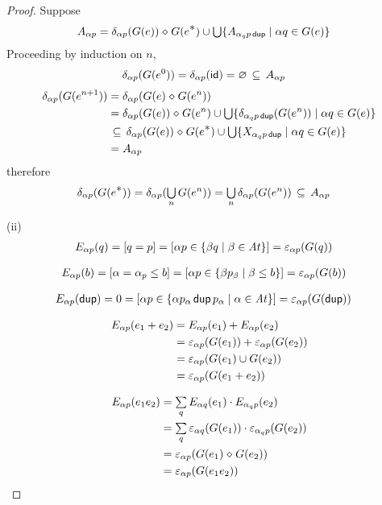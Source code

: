 \documentclass{article}
\newcommand\At{\ensuremath{\mathit{At}}}
\renewcommand\smash{\mathrel{\diamond}}
\newcommand\ssum{\mathop{\textstyle\sum}}
\newcommand\pdup{\mathop{\mathsf{dup}}}
\newcommand\bval[1]{[#1]}
\renewcommand\star{^{\textstyle *}}
\newcommand\id{\mathsf{id}}
\newcommand\sbigcup{\mathop{\textstyle\bigcup}}
\begin{document}
\begin{proof}
Suppose
\begin{align*}
A_{\alpha p}
&= \delta_{\alpha p}(G(e))\smash G(e\star) \cup \sbigcup \set{A_{\alpha_q p\pdup}}{\alpha q\in G(e)}
\end{align*}
Proceeding by induction on $n$,
\begin{align*}
\delta_{\alpha p}(G(e^0))
&= \delta_{\alpha p}(\id)
= \emptyset
\subs A_{\alpha p}
\end{align*}
\begin{align*}
\delta_{\alpha p}(G(e^{n+1}))
&= \delta_{\alpha p}(G(e)\smash G(e^n))\\
&= \delta_{\alpha p}(G(e))\smash G(e^n) \cup \sbigcup \set{\delta_{\alpha_q p\pdup}(G(e^n))}{\alpha q\in G(e)}\\
&\subs \delta_{\alpha p}(G(e))\smash G(e\star) \cup \sbigcup \set{X_{\alpha_q p\pdup}}{\alpha q\in G(e)}\\
&= A_{\alpha p}
\end{align*}
therefore
\begin{align*}
\delta_{\alpha p}(G(e\star))
&= \delta_{\alpha p}(\sbigcup_n G(e^n))
= \sbigcup_n\delta_{\alpha p}(G(e^n))
\subs A_{\alpha p}
\end{align*}

(ii)
\begin{align*}
E_{\alpha p}(q)
&= \bval{q = p}
= \bval{\alpha p\in\set{\beta q}{\beta\in\At}}
= \eps_{\alpha p}(G(q))
\end{align*}

\begin{align*}
E_{\alpha p}(b)
&= \bval{\alpha=\alpha_p\leq b}
= \bval{\alpha p\in\set{\beta p_\beta}{\beta\leq b}}
= \eps_{\alpha p}(G(b))
\end{align*}

\begin{align*}
E_{\alpha p}(\pdup)
&= 0
= \bval{\alpha p\in\set{\alpha p_\alpha\pdup p_\alpha}{\alpha\in\At}}
= \eps_{\alpha p}(G(\pdup))
\end{align*}

\begin{align*}
E_{\alpha p}(e_1+e_2)
&= E_{\alpha p}(e_1)+E_{\alpha p}(e_2)\\
&= \varepsilon_{\alpha p}(G(e_1)) + \varepsilon_{\alpha p}(G(e_2))\\
&= \varepsilon_{\alpha p}(G(e_1)\cup G(e_2))\\
&= \varepsilon_{\alpha p}(G(e_1+e_2))
\end{align*}

\begin{align*}
E_{\alpha p}(e_1e_2)
&= \ssum_{q} E_{\alpha q}(e_1)\cdot E_{\alpha_q p}(e_2)\\
&= \ssum_{q} \eps_{\alpha q}(G(e_1))\cdot \eps_{\alpha_q p}(G(e_2))\\
&= \eps_{\alpha p}(G(e_1)\smash G(e_2))\\
&= \eps_{\alpha p}(G(e_1e_2))
\end{align*}


\end{proof}
\end{document}
